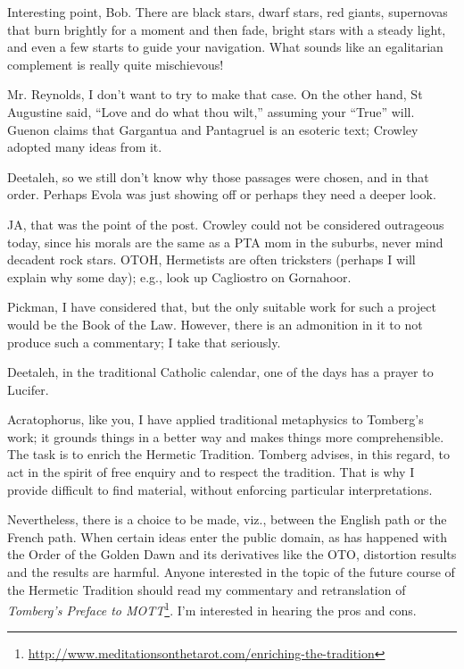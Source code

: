 \begin{footnotesize}
\begin{sffamily}
Interesting point, Bob. There are black stars, dwarf stars, red giants, supernovas that burn brightly for a moment and then fade, bright stars with a steady light, and even a few starts to guide your navigation. What sounds like an egalitarian complement is really quite mischievous!

Mr. Reynolds, I don't want to try to make that case. On the other hand, St Augustine said, ``Love and do what thou wilt,'' assuming your ``True'' will. Guenon claims that Gargantua and Pantagruel is an esoteric text; Crowley adopted many ideas from it.

Deetaleh, so we still don't know why those passages were chosen, and in that order. Perhaps Evola was just showing off or perhaps they need a deeper look.

JA, that was the point of the post. Crowley could not be considered outrageous today, since his morals are the same as a PTA mom in the suburbs, never mind decadent rock stars. OTOH, Hermetists are often tricksters (perhaps I will explain why some day); e.g., look up Cagliostro on Gornahoor.

Pickman, I have considered that, but the only suitable work for such a project would be the Book of the Law. However, there is an admonition in it to not produce such a commentary; I take that seriously.

Deetaleh, in the traditional Catholic calendar, one of the days has a prayer to Lucifer.

Acratophorus, like you, I have applied traditional metaphysics to Tomberg's work; it grounds things in a better way and makes things more comprehensible. The task is to enrich the Hermetic Tradition. Tomberg advises, in this regard, to act in the spirit of free enquiry and to respect the tradition. That is why I provide difficult to find material, without enforcing particular interpretations.

Nevertheless, there is a choice to be made, viz., between the English path or the French path. When certain ideas enter the public domain, as has happened with the Order of the Golden Dawn and its derivatives like the OTO, distortion results and the results are harmful. Anyone interested in the topic of the future course of the Hermetic Tradition should read my commentary and retranslation of \textit{Tomberg's Preface to MOTT}\footnote{\url{http://www.meditationsonthetarot.com/enriching-the-tradition}}. I'm interested in hearing the pros and cons.

\hfill


\end{sffamily}
\end{footnotesize}
